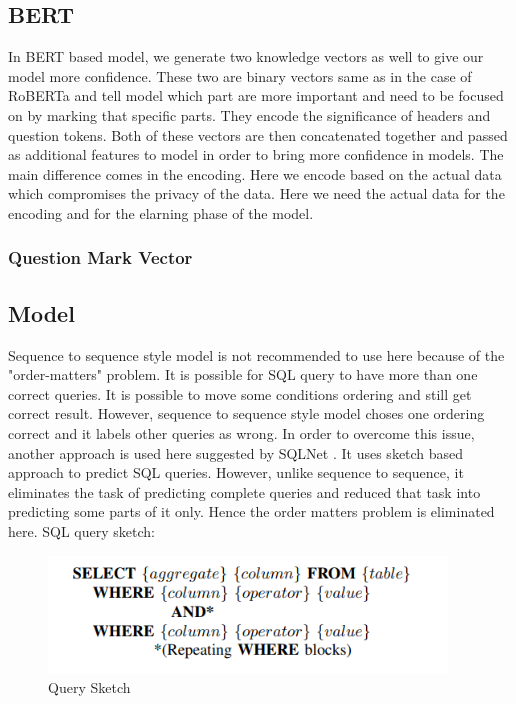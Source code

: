 \documentclass[12pt]{article}
\begin{document}
\subsection{BERT}
In BERT based model, we generate two knowledge vectors as well to give our model more confidence. These two are binary vectors same as in the case of RoBERTa and tell model which part are more important and need to be focused on by marking that specific parts. They encode the significance of headers and question tokens. Both of these vectors are then concatenated together and passed as additional features to model in order to bring more confidence in models. The main difference comes in the encoding. Here we encode based on the actual data which compromises the privacy of the data. Here we need the actual data for the encoding and for the elarning phase of the model. 

\subsubsection{Question Mark Vector}

\subsection{Model}
Sequence to sequence style model is not recommended to use here because of the "order-matters" problem. It is possible for SQL query to have more than one correct queries. It is possible to move some conditions ordering and still get correct result. However, sequence to sequence style model choses one ordering correct and it labels other queries as wrong. In order to overcome this issue, another approach is used here suggested by SQLNet \cite{xu2017sqlnet}. It uses sketch based approach to predict SQL queries. However, unlike sequence to sequence, it eliminates the task of predicting complete queries and reduced that task into predicting some parts of it only. Hence the order matters problem is eliminated here. SQL query sketch:
 
\begin{figure}[H]
    \includegraphics[width=300pt]{sketch}
    \caption{Query Sketch}
    \label{fig:Query Sketch}
\end{figure}
\end{document}
